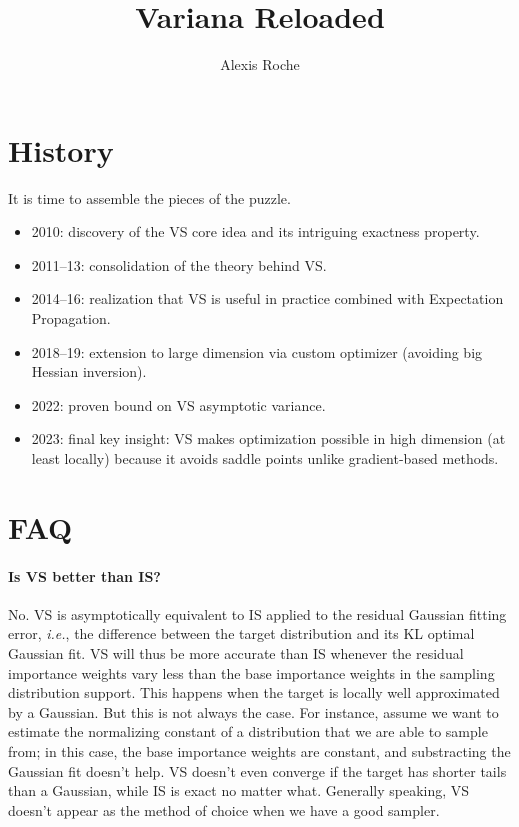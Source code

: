 \documentclass{article}
\title{Variana Reloaded}
\author{Alexis Roche}
\begin{document}
\maketitle

\section{History}

It is time to assemble the pieces of the puzzle.
\begin{itemize}
\item 2010: discovery of the VS core idea and its intriguing exactness property.
\item 2011--13: consolidation of the theory behind VS.
\item 2014--16: realization that VS is useful in practice combined with Expectation Propagation.
\item 2018--19: extension to large dimension via custom optimizer (avoiding big Hessian inversion).
\item 2022: proven bound on VS asymptotic variance.
\item 2023: final key insight: VS makes optimization possible in high dimension (at least locally) because it avoids saddle points unlike gradient-based methods.
\end{itemize}


\section{FAQ}

\paragraph{Is VS better than IS?} No. VS is asymptotically equivalent to IS applied to the residual Gaussian fitting error, {\em i.e.}, the difference between the target distribution and its KL optimal Gaussian fit. VS will thus be more accurate than IS whenever the residual importance weights vary less than the base importance weights in the sampling distribution support. This happens when the target is locally well approximated by a Gaussian. But this is not always the case. For instance, assume we want to estimate the normalizing constant of a distribution that we are able to sample from; in this case, the base importance weights are constant, and substracting the Gaussian fit doesn't help. VS doesn't even converge if the target has shorter tails than a Gaussian, while IS is exact no matter what. Generally speaking, VS doesn't appear as the method of choice when we have a good sampler.
\end{document}
